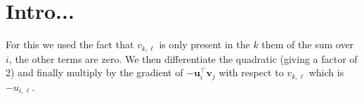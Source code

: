 
\chapter{Intro...} %

\label{Chapter7} %



For this we used the fact that $v_{k,\ell}$ is only present in the $k$ them of the sum over $i$, the other terms are zero. We then differentiate the quadratic (giving a factor of 2) and finally multiply by the gradient of $-\mathbf{u}_{i}^\top\mathbf{v}_j$ with respect to $v_{k,\ell}$ which is $-u_{i,\ell}$.